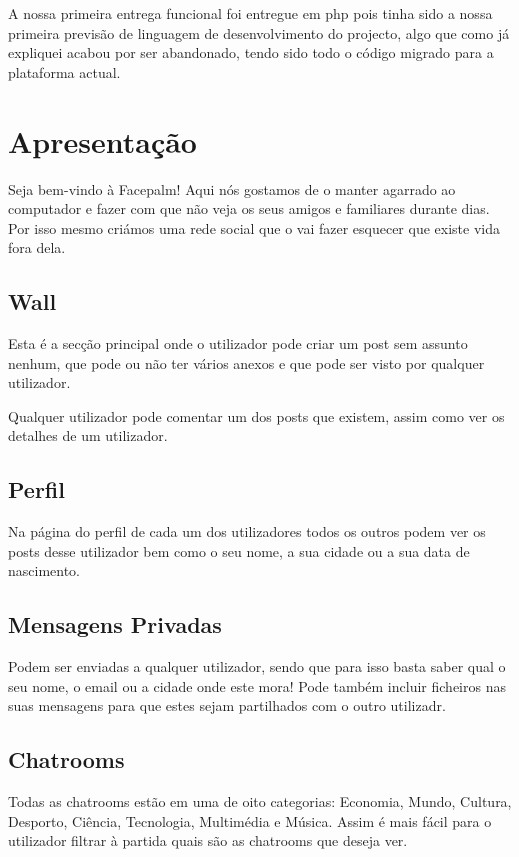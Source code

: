 \documentclass[a4paper, 12pt]{article}
\begin{document}
A nossa primeira entrega funcional foi entregue em php pois tinha sido a nossa primeira previsão de linguagem de desenvolvimento do projecto, algo que como já expliquei acabou por ser abandonado, tendo sido todo o código migrado para a plataforma actual.
\cleardoublepage


\section{Apresentação}
\indent \indent Seja bem-vindo à Facepalm! Aqui nós gostamos de o manter agarrado ao computador e fazer com que não veja os seus amigos e familiares durante dias. Por isso mesmo criámos uma rede social que o vai fazer esquecer que existe vida fora dela.

\subsection{Wall}
\indent \indent Esta é a secção principal onde o utilizador pode criar um post sem assunto nenhum, que pode ou não ter vários anexos e que pode ser visto por qualquer utilizador.

Qualquer utilizador pode comentar um dos posts que existem, assim como ver os detalhes de um utilizador.

\subsection{Perfil}
\indent \indent Na página do perfil de cada um dos utilizadores todos os outros podem ver os posts desse utilizador bem como o seu nome, a sua cidade ou a sua data de nascimento.

\subsection{Mensagens Privadas}
\indent \indent Podem ser enviadas a qualquer utilizador, sendo que para isso basta saber qual o seu nome, o email ou a cidade onde este mora! Pode também incluir ficheiros nas suas mensagens para que estes sejam partilhados com o outro utilizadr.

\subsection{Chatrooms}
\indent \indent Todas as chatrooms estão em uma de oito categorias: Economia, Mundo, Cultura, Desporto, Ciência, Tecnologia, Multimédia e Música. Assim é mais fácil para o utilizador filtrar à partida quais são as chatrooms que deseja ver.
\end{document}
